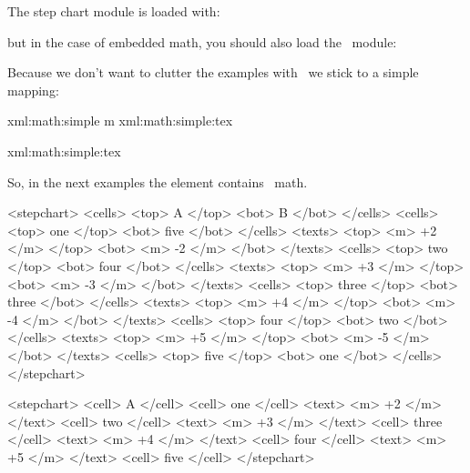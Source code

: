 \typebuffer \processxmlbuffer

\stopsection

\startsection[title=Usage]

The step chart module is loaded with:

\starttyping
\usemodule[cell] %
\stoptyping

\noindentation but in the case of embedded math, you should also load the \MATHML\ module:

\starttyping
{}
\stoptyping

\stopsection

\startsection[title=\XML\ example]

Because we don't want to clutter the examples with \MATHML\ we stick to a simple
mapping:

\startbuffer
\startxmlsetups xml:math:simple
     {m} {xml:math:simple:tex}
\stopxmlsetups

\startxmlsetups xml:math:simple:tex
\stopxmlsetups

\stopbuffer

\typebuffer \getbuffer

So, in the next examples the  element contains \TEX\ math.

\startbuffer
<stepchart>
  <cells> <top> A           </top> <bot> B           </bot> </cells>
  <cells> <top> one         </top> <bot> five        </bot> </cells>
  <texts> <top> <m> +2 </m> </top> <bot> <m> -2 </m> </bot> </texts>
  <cells> <top> two         </top> <bot> four        </bot> </cells>
  <texts> <top> <m> +3 </m> </top> <bot> <m> -3 </m> </bot> </texts>
  <cells> <top> three       </top> <bot> three       </bot> </cells>
  <texts> <top> <m> +4 </m> </top> <bot> <m> -4 </m> </bot> </texts>
  <cells> <top> four        </top> <bot> two         </bot> </cells>
  <texts> <top> <m> +5 </m> </top> <bot> <m> -5 </m> </bot> </texts>
  <cells> <top> five        </top> <bot> one         </bot> </cells>
</stepchart>
\stopbuffer

\typebuffer \processxmlbuffer

\startbuffer
<stepchart>
  <cell> A     </cell>
  <cell> one   </cell> <text> <m> +2 </m> </text>
  <cell> two   </cell> <text> <m> +3 </m> </text>
  <cell> three </cell> <text> <m> +4 </m> </text>
  <cell> four  </cell> <text> <m> +5 </m> </text>
  <cell> five  </cell>
</stepchart>
\stopbuffer

\typebuffer \processxmlbuffer

